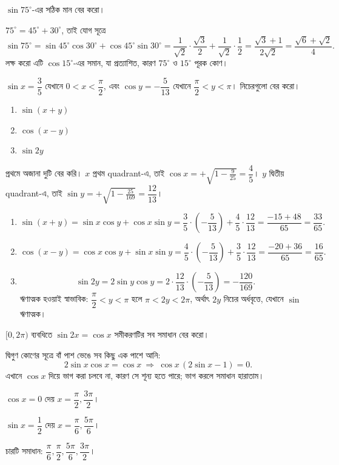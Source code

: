 \documentclass[11pt]{article}
\begin{document}
 $\sin 75^\circ$-এর সঠিক মান বের করো।

\begin{sol}
$75^\circ = 45^\circ + 30^\circ$, তাই যোগ সূত্রে
\[
  \sin 75^\circ = \sin 45^\circ \cos 30^\circ + \cos 45^\circ \sin 30^\circ
  = \frac{1}{\sqrt{2}} \cdot \frac{\sqrt{3}}{2}
  + \frac{1}{\sqrt{2}} \cdot \frac{1}{2}
  = \frac{\sqrt{3}+1}{2\sqrt{2}} = \frac{\sqrt{6}+\sqrt{2}}{4} .
\]
লক্ষ করো এটি $\cos 15^\circ$-এর সমান, যা প্রত্যাশিত, কারণ
$75^\circ$ ও $15^\circ$ পূরক কোণ।
\end{sol}

 $\sin x = \dfrac{3}{5}$ যেখানে $0 < x < \dfrac{\pi}{2}$, এবং
$\cos y = -\dfrac{5}{13}$ যেখানে $\dfrac{\pi}{2} < y < \pi$। নিচেরগুলো বের করো।
\begin{enumerate}
  \item $\sin(x+y)$
  \item $\cos(x-y)$
  \item $\sin 2y$
\end{enumerate}

\begin{sol}
প্রথমে অজানা দুটি বের করি। $x$ প্রথম quadrant-এ, তাই
$\cos x = +\sqrt{1 - \tfrac{9}{25}} = \dfrac{4}{5}$।
$y$ দ্বিতীয় quadrant-এ, তাই
$\sin y = +\sqrt{1 - \tfrac{25}{169}} = \dfrac{12}{13}$।

\begin{enumerate}
  \item
        \[
          \sin(x+y) = \sin x \cos y + \cos x \sin y
          = \frac{3}{5}\cdot\left(-\frac{5}{13}\right)
          + \frac{4}{5}\cdot\frac{12}{13}
          = \frac{-15 + 48}{65} = \frac{33}{65} .
        \]
  \item
        \[
          \cos(x-y) = \cos x \cos y + \sin x \sin y
          = \frac{4}{5}\cdot\left(-\frac{5}{13}\right)
          + \frac{3}{5}\cdot\frac{12}{13}
          = \frac{-20 + 36}{65} = \frac{16}{65} .
        \]
  \item
        \[
          \sin 2y = 2 \sin y \cos y
          = 2 \cdot \frac{12}{13} \cdot \left(-\frac{5}{13}\right)
          = -\frac{120}{169} .
        \]
        ঋণাত্মক হওয়াই স্বাভাবিক: $\dfrac{\pi}{2} < y < \pi$ হলে
        $\pi < 2y < 2\pi$, অর্থাৎ $2y$ নিচের অর্ধবৃত্তে, যেখানে $\sin$ ঋণাত্মক।
\end{enumerate}
\end{sol}

 $[0, 2\pi)$ ব্যবধিতে $\sin 2x = \cos x$ সমীকরণটির সব সমাধান বের করো।

\begin{sol}
দ্বিগুণ কোণের সূত্রে বাঁ পাশ ভেঙে সব কিছু এক পাশে আনি:
\[
  2\sin x\cos x = \cos x
  \ \Longrightarrow\ \cos x\,(2\sin x - 1) = 0 .
\]
এখানে $\cos x$ দিয়ে ভাগ করা চলবে না, কারণ সে শূন্য হতে পারে; ভাগ করলে
সমাধান হারাতাম।

$\cos x = 0$ দেয় $x = \dfrac{\pi}{2}, \dfrac{3\pi}{2}$।

$\sin x = \dfrac{1}{2}$ দেয় $x = \dfrac{\pi}{6}, \dfrac{5\pi}{6}$।

চারটি সমাধান:
$\dfrac{\pi}{6}, \dfrac{\pi}{2}, \dfrac{5\pi}{6}, \dfrac{3\pi}{2}$।
\end{sol}
\end{document}
